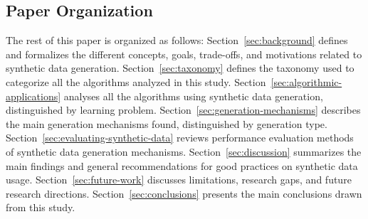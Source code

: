\subsection{Paper Organization}

The rest of this paper is organized as follows: Section~\ref{sec:background}
defines and formalizes the different concepts, goals, trade-offs, and
motivations related to synthetic data generation. Section~\ref{sec:taxonomy}
defines the taxonomy used to categorize all the algorithms analyzed in this
study. Section~\ref{sec:algorithmic-applications} analyses all the algorithms
using synthetic data generation, distinguished by learning problem.
Section~\ref{sec:generation-mechanisms} describes the main generation
mechanisms found, distinguished by generation type.
Section~\ref{sec:evaluating-synthetic-data} reviews performance evaluation
methods of synthetic data generation mechanisms. Section~\ref{sec:discussion}
summarizes the main findings and general recommendations for good practices on
synthetic data usage. Section~\ref{sec:future-work} discusses limitations,
research gaps, and future research directions. Section~\ref{sec:conclusions}
presents the main conclusions drawn from this study.
